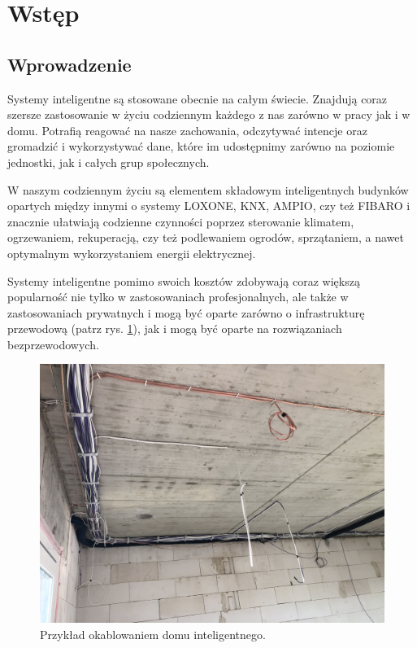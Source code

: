\documentclass[a4paper,12pt,reqno]{article}
\begin{document}
%
%
\section{Wstęp} \label{section:wstep}

\subsection{Wprowadzenie}

Systemy inteligentne są stosowane obecnie na całym świecie. Znajdują coraz szersze zastosowanie w życiu codziennym każdego z nas zarówno w pracy jak i w domu. Potrafią reagować na nasze zachowania, odczytywać intencje oraz gromadzić i wykorzystywać dane, które im udostępnimy zarówno na poziomie jednostki, jak i całych grup społecznych.

W naszym codziennym życiu są elementem składowym inteligentnych budynków opartych między innymi o systemy LOXONE, KNX, AMPIO, czy też FIBARO i znacznie ułatwiają codzienne czynności poprzez sterowanie klimatem, ogrzewaniem, rekuperacją, czy też podlewaniem ogrodów, sprzątaniem, a nawet optymalnym wykorzystaniem energii elektrycznej.

Systemy inteligentne pomimo swoich kosztów zdobywają coraz większą popularność nie tylko w zastosowaniach profesjonalnych, ale także w zastosowaniach prywatnych i mogą być oparte zarówno o infrastrukturę przewodową (patrz rys. \ref{kable}), jak i mogą być oparte na rozwiązaniach bezprzewodowych.

\begin{figure}[H]%
\centering
\includegraphics[width=0.8\columnwidth]{imgs/domkable.jpg}
\caption{Przykład okablowaniem domu inteligentnego. \label{kable}}
\quad
\end{figure}
\end{document}
